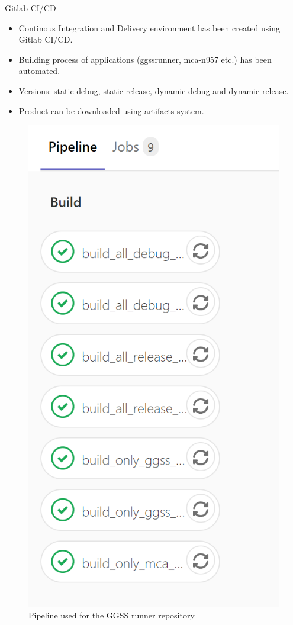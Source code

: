 \documentclass[10pt]{beamer}
\begin{document}
\begin{frame}{Gitlab CI/CD}
\begin{minipage}{0.65\linewidth}
\begin{itemize}
  \item Continous Integration and Delivery environment has been created using Gitlab CI/CD.
  \item Building process of applications (ggssrunner, mca-n957 etc.) has been automated. 
  \item Versions: static debug, static release, dynamic debug and dynamic release. 
  \item Product can be downloaded using artifacts system.
\end{itemize}
\end{minipage}
\begin{minipage}{0.32\linewidth}
\begin{figure}
\centering
\includegraphics[width=0.8\linewidth]{resources/runnerPipeline}
\caption{Pipeline used for the GGSS runner repository}
\end{figure}
\end{minipage}
\end{frame}
\end{document}
